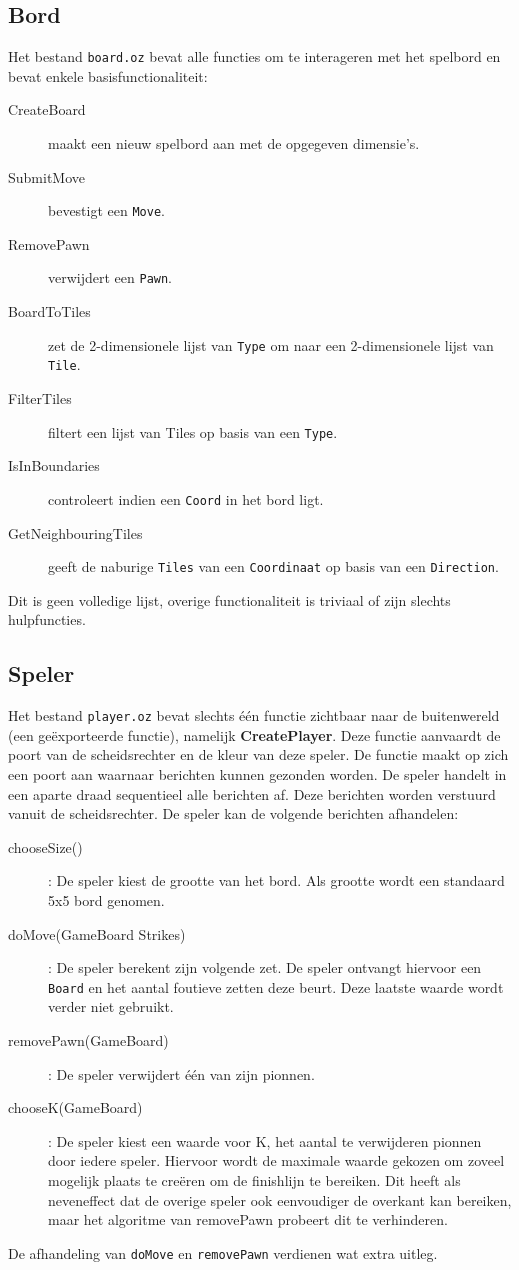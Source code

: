 \documentclass{article}
\begin{document}
\subsection{Bord}
Het bestand \texttt{board.oz} bevat alle functies om te interageren met het spelbord en bevat enkele basisfunctionaliteit: 
\begin{description}
	\item[CreateBoard] maakt een nieuw spelbord aan met de opgegeven dimensie's. 
	\item[SubmitMove] bevestigt een \texttt{Move}.
	\item[RemovePawn] verwijdert een \texttt{Pawn}.
	\item[BoardToTiles] zet de 2-dimensionele lijst van \texttt{Type} om naar een 2-dimensionele lijst van \texttt{Tile}.
	\item[FilterTiles] filtert een lijst van Tiles op basis van een \texttt{Type}.
	\item[IsInBoundaries] controleert indien een \texttt{Coord} in het bord ligt. 
	\item[GetNeighbouringTiles] geeft de naburige \texttt{Tiles} van een \texttt{Coordinaat} op basis van een \texttt{Direction}.
\end{description}
Dit is geen volledige lijst, overige functionaliteit is triviaal of zijn slechts hulpfuncties.  

\subsection{Speler}
Het bestand \texttt{player.oz} bevat slechts één functie zichtbaar naar de buitenwereld (een geëxporteerde functie), namelijk \textbf{CreatePlayer}. Deze functie aanvaardt de poort van de scheidsrechter en de kleur van deze speler. De functie maakt op zich een poort aan waarnaar berichten kunnen gezonden worden. De speler handelt in een aparte draad sequentieel alle berichten af. Deze berichten worden verstuurd vanuit de scheidsrechter. De speler kan de volgende berichten afhandelen:
\begin{description}
	\item[chooseSize()]: De speler kiest de grootte van het bord. Als grootte wordt een standaard 5x5 bord genomen. 
	\item[doMove(GameBoard Strikes)]: De speler berekent zijn volgende zet. De speler ontvangt hiervoor een \texttt{Board} en het aantal foutieve zetten deze beurt. Deze laatste waarde wordt verder niet gebruikt. 
	\item[removePawn(GameBoard)]: De speler verwijdert één van zijn pionnen. 
	\item[chooseK(GameBoard)]: De speler kiest een waarde voor K, het aantal te verwijderen pionnen door iedere speler. Hiervoor wordt de maximale waarde gekozen om zoveel mogelijk plaats te creëren om de finishlijn te bereiken. Dit heeft als neveneffect dat de overige speler ook eenvoudiger de overkant kan bereiken, maar het algoritme van removePawn probeert dit te verhinderen. 
\end{description}
De afhandeling van \texttt{doMove} en \texttt{removePawn} verdienen wat extra uitleg. 
\end{document}
